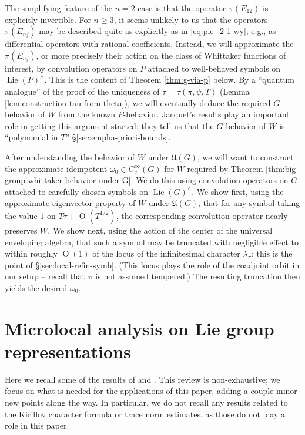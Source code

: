 \documentclass[reqno]{amsart}
\DeclareMathOperator{\Lie}{Lie}
\def\O{\operatorname{O}}
\theoremstyle{plain} \newtheorem{theorem} {Theorem}
\theoremstyle{definition} \newtheorem{definition} [theorem] {Definition}
\theoremstyle{itplain} %
\numberwithin{equation}{section}
\numberwithin{theorem}{section}
\renewcommand{\geq}{\geqslant}
\begin{document}
The simplifying feature of the $n=2$ case is that the operator $\pi(E_{12})$ is explicitly invertible.  For $n \geq 3$, it seems unlikely to us that the operators $\pi(E_{n j})$ may be described quite as explicitly as in \eqref{eq:pie_2-1-wy}, e.g., as differential operators with rational coefficients.  Instead, we will approximate the $\pi(E_{n j})$, or more precisely their action on the class of Whittaker functions of interest, by convolution operators on $P$ attached to well-behaved symbols on $\Lie(P)^\wedge$.  This is the content of Theorem \ref{thm:g-via-p} below.  By a ``quantum analogue'' of the proof of the uniqueness of $\tau = \tau(\pi, \psi, T)$ (Lemma \ref{lem:construction-tau-from-theta}), we will eventually deduce the required $G$-behavior of $W$ from the known $P$-behavior.  Jacquet's results play an important role in getting this argument started: they tell us that the $G$-behavior of $W$ is ``polynomial in $T$'' \S\ref{sec:empha-priori-bounds}.

After understanding the behavior of $W$ under $\mathfrak{U}(G)$, we will want to construct the approximate idempotent $\omega_0 \in C_c^\infty(G)$ for $W$ required by Theorem \ref{thm:big-group-whittaker-behavior-under-G}.  We do this using convolution operators on $G$ attached to carefully-chosen symbols on $\Lie(G)^\wedge$.  We show first, using the approximate eigenvector property of $W$ under $\mathfrak{U}(G)$, that for any symbol taking the value $1$ on $T \tau + \O(T^{1/2})$, the corresponding convolution operator nearly preserves $W$.  We show next, using the action of the center of the universal enveloping algebra, that such a symbol may be truncated with negligible effect to within roughly $\O(1)$ of the locus of the infinitesimal character $\lambda_\pi$; this is the point of  \S\ref{sec:local-refin-symb}.  (This locus plays the role of the coadjoint orbit in our setup -- recall that $\pi$ is not assumed tempered.)  The resulting truncation then yields the desired $\omega_0$.



\section{Microlocal analysis on Lie group representations}
Here we recall some of the results of \cite[Parts 1 and 2]{nelson-venkatesh-1} and \cite[\S8-\S10]{2020arXiv201202187N}.  This review is non-exhaustive; we focus on what is needed for the applications of this paper, adding a couple minor new points along the way.  In particular, we do not recall any results related to the Kirillov character formula or trace norm estimates, as those do not play a role in this paper.
\end{document}
